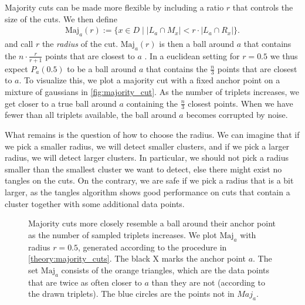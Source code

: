 Majority cuts can be made more flexible by including a ratio $r$ that controls the size of the cuts. 
We then define 
\begin{align}
\text{Maj}_a(r) := \{x \in D \mid \left|   L_a \cap M_x\right| < r \cdot \left| L_a \cap R_x \right| \}
.\end{align}
and call $r$ the \textit{radius} of the cut. 
$\text{Maj} _a(r)$ is then a ball around $a$ that contains the $n \cdot \frac{r}{r+1}$ points that are closest to $a$ . In a euclidean setting for 
$r = 0.5$ we thus expect $P_a(0.5)$ to be a ball around $a$ that contains the $\frac{n}{3}$ points that are closest to $a$. To visualize this, we plot a majority cut with a fixed anchor point on a 
mixture of gaussians in \autoref{fig:majority_cut}. 
As the number of triplets increases, we get closer to a true ball around $a$ containing the $\frac{n}{3}$ closest points. 
When we have fewer than all triplets available, the ball around $a$ becomes corrupted by noise.

What remains is the question of how to choose the radius. We can imagine that if we pick a smaller radius, we will detect smaller clusters, and if we pick a larger radius, we will detect larger
clusters. 
In particular, we should not pick a radius smaller than the smallest cluster we want to detect, else there might exist no tangles on the cuts. 
On the contrary, we are safe if we pick a radius that is a bit larger, as the tangles algorithm shows good performance on cuts that contain a cluster together with some additional data points.

\onecolumn
\begin{figure}[ht]
    \centering
    \subfloat[500 (0.47\%) triplets]{%
      \resizebox{0.5\textwidth}{!}{}}
    \subfloat[5000 (4.7\%) triplets]{%
      \resizebox{0.5\textwidth}{!}{}}
    \hfill
    \subfloat[20000 (18.8\%) triplets]{%
      \resizebox{0.5\textwidth}{!}{}}
    \subfloat[106200 (100\%) triplets]{%
      \resizebox{0.5\textwidth}{!}{}}
    \caption{Majority cuts more closely resemble a ball around their anchor point as the number of 
        sampled triplets increases. 
        We plot $\text{Maj}_a$ with radius $r=0.5$, generated according to the procedure in \autoref{theory:majority_cuts}. The black X marks the anchor point $a$. 
        The set $\text{Maj}_a$ consists of the orange triangles, which are the data points that are twice as often closer to $a$ than they are not (according to the drawn triplets). 
        The blue circles are the points not in $Maj_a$.}
    \label{fig:majority_cut}
\end{figure}

